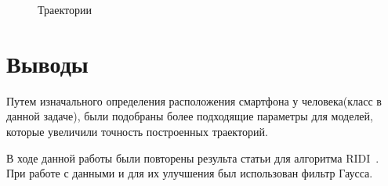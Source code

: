 \documentclass{article}
\begin{document}
\begin{figure}[h]
\begin{minipage}[h]{0.49\linewidth}
\end{minipage}
\hfill
\begin{minipage}[h]{0.49\linewidth}
\end{minipage}
\caption{Траектории}
\label{ris:image1}
\end{figure}

\section{Выводы}

Путем изначального определения расположения смартфона у человека(класс в данной задаче), были подобраны более подходящие параметры для моделей, которые увеличили точность построенных траекторий.

В ходе данной работы были повторены результа статьи для алгоритма RIDI~\cite{journals/corr/abs-1712-09004}. При работе с данными и для их улучшения был использован фильтр Гаусса.
\end{document}
